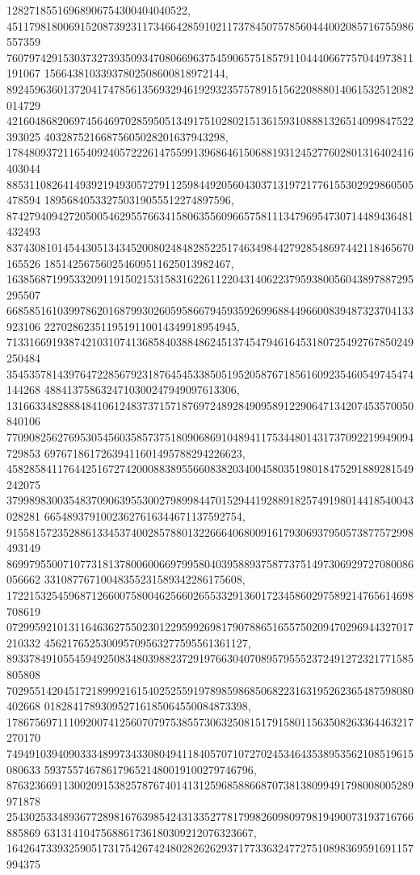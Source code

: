 \documentclass[12pt]{article}
\begin{document}
12827185516968906754300404040522, 
451179818006915208739231173466428591021173784507578560444002085716755986557359
760797429153037327393509347080669637545906575185791104440667757044973811191067
15664381033937802508600818972144, 
892459636013720417478561356932946192932357578915156220888014061532512082014729
421604868206974564697028595051349175102802151361593108881326514099847522393025
40328752166875605028201637943298, 
178480937211654092405722261475599139686461506881931245277602801316402416403044
885311082641493921949305727911259844920560430371319721776155302929860505478594
189568405332750319055512274897596, 
874279409427205005462955766341580635560966575811134796954730714489436481432493
837430810145443051343452008024848285225174634984427928548697442118465670165526
185142567560254609511625013982467, 
163856871995332091191502153158316226112204314062237959380056043897887295295507
668585161039978620168799302605958667945935926996884496600839487323704133923106
2270286235119519110014349918954945, 
713316691938742103107413685840388486245137454794616453180725492767850249250484
354535781439764722856792318764545338505195205876718561609235460549745474144268
4884137586324710300247949097613306, 
131663348288848410612483737157187697248928490958912290647134207453570050840106
770908256276953054560358573751809068691048941175344801431737092219949094729853
69767186172639411601495788294226623, 
458285841176442516727420008838955660838203400458035198018475291889281549242075
379989830035483709063955300279899844701529441928891825749198014418540043028281
66548937910023627616344671137592754, 
915581572352886133453740028578801322666406800916179306937950573877572998493149
869979550071077318137800600669799580403958893758773751497306929727080086056662
33108776710048355231589342286175608, 
172215325459687126600758004625660265533291360172345860297589214765614698708619
072995921013116463627550230122959926981790788651655750209470296944327017210332
456217652530095709563277595561361127, 
893378491055459492508348039882372919766304070895795552372491272321771585805808
702955142045172189992161540252559197898598685068223163195262365487598080402668
018284178930952716185064550084873398, 
178675697111092007412560707975385573063250815179158011563508263364463217270170
749491039409033348997343308049411840570710727024534643538953562108519615080633
5937557467861796521480019100279746796, 
876323669113002091538257876740141312596858866870738138099491798008005289971878
254302533489367728981676398542431335277817998260980979819490073193716766885869
6313141047568861736180309212076323667, 
164264733932590517317542674248028262629371773363247727510898369591691157994375
\end{document}
